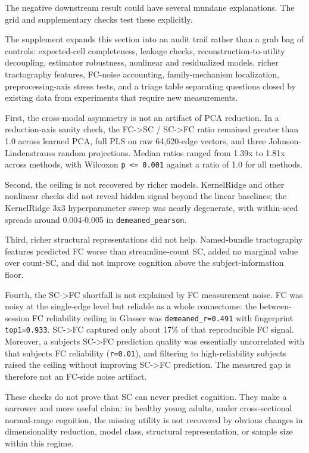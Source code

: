 The negative downstream result could have several mundane explanations. The grid and supplementary checks test these explicitly.

The supplement expands this section into an audit trail rather than a grab bag of controls: expected-cell completeness, leakage checks, reconstruction-to-utility decoupling, estimator robustness, nonlinear and residualized models, richer tractography features, FC-noise accounting, family-mechanism localization, preprocessing-axis stress tests, and a triage table separating questions closed by existing data from experiments that require new measurements.

First, the cross-modal asymmetry is not an artifact of PCA reduction. In a reduction-axis sanity check, the FC-\textgreater SC / SC-\textgreater FC ratio remained greater than 1.0 across learned PCA, full PLS on raw 64,620-edge vectors, and three Johnson-Lindenstrauss random projections. Median ratios ranged from 1.39x to 1.81x across methods, with Wilcoxon \texttt{p\ \textless{}=\ 0.001} against a ratio of 1.0 for all methods.

Second, the ceiling is not recovered by richer models. KernelRidge and other nonlinear checks did not reveal hidden signal beyond the linear baselines; the KernelRidge 3x3 hyperparameter sweep was nearly degenerate, with within-seed spreads around 0.004-0.005 in \texttt{demeaned\_pearson}.

Third, richer structural representations did not help. Named-bundle tractography features predicted FC worse than streamline-count SC, added no marginal value over count-SC, and did not improve cognition above the subject-information floor.

Fourth, the SC-\textgreater FC shortfall is not explained by FC measurement noise. FC was noisy at the single-edge level but reliable as a whole connectome: the between-session FC reliability ceiling in Glasser was \texttt{demeaned\_r=0.491} with fingerprint \texttt{top1=0.933}. SC-\textgreater FC captured only about 17\% of that reproducible FC signal. Moreover, a subject\textquotesingle s SC-\textgreater FC prediction quality was essentially uncorrelated with that subject\textquotesingle s FC reliability (\texttt{r=0.01}), and filtering to high-reliability subjects raised the ceiling without improving SC-\textgreater FC prediction. The measured gap is therefore not an FC-side noise artifact.

These checks do not prove that SC can never predict cognition. They make a narrower and more useful claim: in healthy young adults, under cross-sectional normal-range cognition, the missing utility is not recovered by obvious changes in dimensionality reduction, model class, structural representation, or sample size within this regime.

